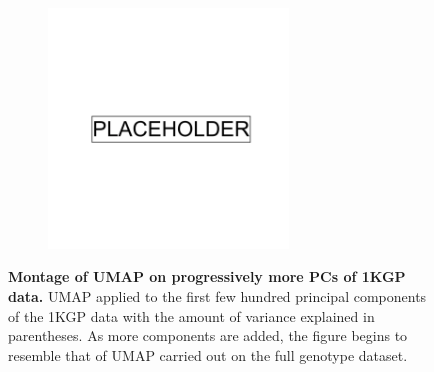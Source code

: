 \begin{figure}[ht]
    \centering
    \begin{subfigure}{0.95\textwidth}
    \includegraphics[width=0.7\textwidth]{placeholder.png}
    \end{subfigure}
    \caption[Montage of UMAP on progressively more PCs of 1KGP data]{\textbf{Montage of UMAP on progressively more PCs of 1KGP data.} UMAP applied to the first few hundred principal components of the 1KGP data with the amount of variance explained in parentheses. As more components are added, the figure begins to resemble that of UMAP carried out on the full genotype dataset.}
    \label{fig:supp_montage_1kgp_converge}
\end{figure}

\newpage

